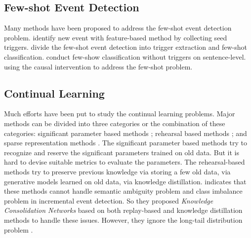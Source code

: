 \subsection{Few-shot Event Detection}
\label{sec:rw_event_detection}
Many methods have been proposed to address the few-shot event detection problem. \citet{bronstein2015seed} identify new event with feature-based method by collecting seed triggers. \citet{deng2020meta} divide the few-shot event detection into trigger extraction and few-shot classification. \citet{feng2020probing} conduct few-show classification without triggers on sentence-level. \citet{chen2021honey} using the causal intervention to address the few-shot problem.

\subsection{Continual Learning}
\label{sec:rw_continual_learning}
Much efforts have been put to study the continual learning problems. Major methods can be divided into three categories or the combination of these categories: significant parameter based methods \citep{kirkpatrick2017overcoming, aljundi2018memory}; rehearsal based methods \citep{rebuffi2017icarl, hou2019learning, shin2017continual, li2017learning, cao2020incremental}; and sparse representation methods \citep{liu2019utility, aljundi2018selfless}.
The significant parameter based methods try to recognize and reserve the significant parameters trained on old data. But it is hard to devise suitable metrics to evaluate the parameters. The rehearsal-based methods try to preserve previous knowledge via storing a few old data\citet{rebuffi2017icarl, hou2019learning}, via generative models learned on old data\citet{shin2017continual}, via knowledge distillation\citep{li2017learning}. \citep{cao2020incremental} indicates that these methods cannot
handle semantic ambiguity problem and class imbalance problem in incremental event detection. So they proposed \textit{Knowledge Consolidation Networks} based on both replay-based and knowledge distillation methods to handle these issues. However, they ignore the long-tail distribution problem \citep{yu2021lifelong}.